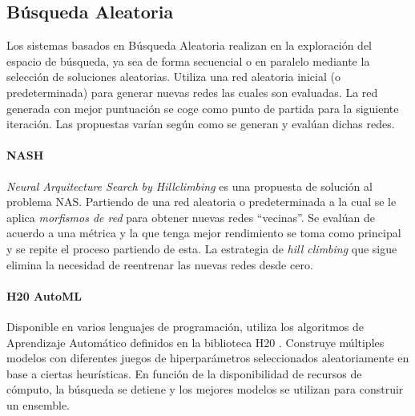 \subsection{B\'usqueda Aleatoria}
Los sistemas basados en B\'usqueda Aleatoria realizan en la exploraci\'on del espacio de b\'usqueda, ya sea de forma secuencial o en paralelo mediante la selecci\'on de soluciones aleatorias. Utiliza una red aleatoria inicial (o predeterminada) para generar nuevas redes las cuales son evaluadas. La red generada con mejor puntuaci\'on se coge como punto de partida para la siguiente iteraci\'on. Las propuestas var\'ian seg\'un como se generan y eval\'uan dichas redes. 

\paragraph{NASH } \textit{Neural Arquitecture Search by Hillclimbing} es una propuesta de soluci\'on al problema NAS.
Partiendo de una red aleatoria o predeterminada a la cual se le aplica \textit{morfismos de red} para obtener  nuevas redes ``vecinas''. Se eval\'uan de acuerdo a una  m\'etrica y la que tenga mejor rendimiento se toma como principal y se repite el proceso partiendo de esta. La estrategia de \textit{hill climbing} que sigue elimina la necesidad de reentrenar las nuevas redes desde cero.

        \paragraph{H20 AutoML } Disponible en varios lenguajes de programaci\'on, utiliza los algoritmos de Aprendizaje Autom\'atico definidos en la biblioteca H20 . Construye m\'ultiples modelos con diferentes juegos de hiperpar\'ametros seleccionados aleatoriamente en base a ciertas heur\'isticas. En funci\'on de la disponibilidad de recursos de c\'omputo, la b\'usqueda se detiene y los mejores modelos se utilizan para construir un ensemble.

